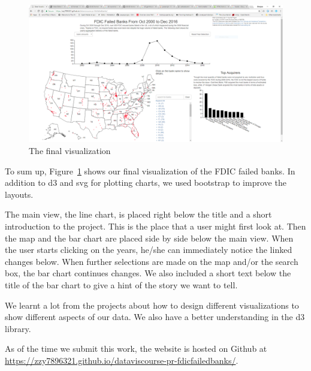 \begin{figure}[!th]
    \centering
    \includegraphics[width=\textwidth]{fig/final}
    \caption{The final visualization}
    \label{fig:final}
\end{figure}

To sum up, Figure~\ref{fig:final} shows our final visualization of the FDIC
failed banks. In addition to d3 and svg for plotting charts, we used bootstrap
to improve the layouts. 

The main view, the line chart, is placed right below the title and a short
introduction to the project. This is the place that a user might first look
at. Then the map and the bar chart are placed side by side below the main
view. When the user starts clicking on the years, he/she can immediately
notice the linked changes below. When further selections are made on the map
and/or the search box, the bar chart continues changes. We also included a
short text below the title of the bar chart to give a hint of the story we
want to tell.

We learnt a lot from the projects about how to design different visualizations
to show different aspects of our data. We also have a better understanding in
the d3 library.

As of the time we submit this work, the website is hosted on Github at
\url{https://zzy7896321.github.io/dataviscourse-pr-fdicfailedbanks/}.


